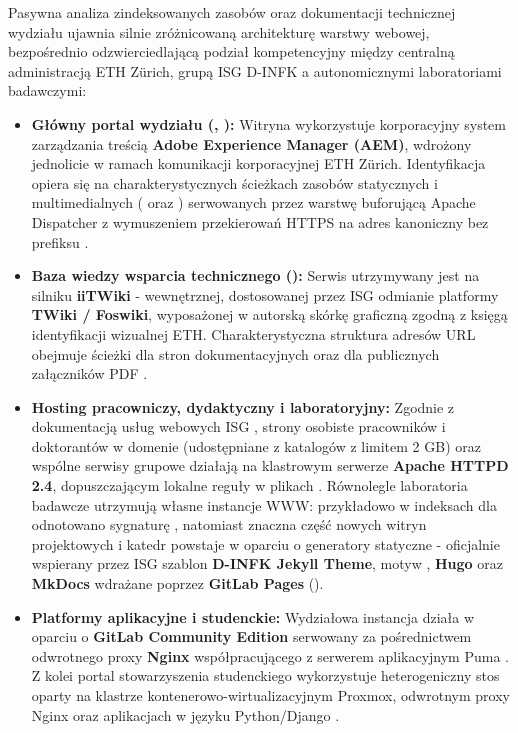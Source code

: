 {{Pasywna analiza zindeksowanych zasobów oraz dokumentacji technicznej wydziału ujawnia silnie zróżnicowaną architekturę warstwy webowej, bezpośrednio odzwierciedlającą podział kompetencyjny między centralną administracją ETH Zürich, grupą ISG D-INFK a autonomicznymi laboratoriami badawczymi:
\begin{itemize}
    \item \textbf{Główny portal wydziału (, ):} Witryna wykorzystuje korporacyjny system zarządzania treścią \textbf{Adobe Experience Manager (AEM)}, wdrożony jednolicie w ramach komunikacji korporacyjnej ETH Zürich. Identyfikacja opiera się na charakterystycznych ścieżkach zasobów statycznych i multimedialnych ( oraz ) serwowanych przez warstwę buforującą Apache Dispatcher z wymuszeniem przekierowań HTTPS na adres kanoniczny bez prefiksu .
    \item \textbf{Baza wiedzy wsparcia technicznego ():} Serwis utrzymywany jest na silniku \textbf{iiTWiki} - wewnętrznej, dostosowanej przez ISG odmianie platformy \textbf{TWiki / Foswiki}, wyposażonej w autorską skórkę graficzną zgodną z księgą identyfikacji wizualnej ETH. Charakterystyczna struktura adresów URL obejmuje ścieżki  dla stron dokumentacyjnych oraz  dla publicznych załączników PDF \cite{isg_dinfk_wiki}.
    \item \textbf{Hosting pracowniczy, dydaktyczny i laboratoryjny:} Zgodnie z dokumentacją usług webowych ISG \cite{isg_dinfk_wiki}, strony osobiste pracowników i doktorantów w domenie  (udostępniane z katalogów  z limitem 2 GB) oraz wspólne serwisy grupowe działają na klastrowym serwerze \textbf{Apache HTTPD 2.4}, dopuszczającym lokalne reguły w plikach . Równolegle laboratoria badawcze utrzymują własne instancje WWW: przykładowo w indeksach dla  odnotowano sygnaturę , natomiast znaczna część nowych witryn projektowych i katedr powstaje w oparciu o generatory statyczne - oficjalnie wspierany przez ISG szablon \textbf{D-INFK Jekyll Theme}, motyw , \textbf{Hugo} oraz \textbf{MkDocs} wdrażane poprzez \textbf{GitLab Pages} ().
    \item \textbf{Platformy aplikacyjne i studenckie:} Wydziałowa instancja  działa w oparciu o \textbf{GitLab Community Edition} serwowany za pośrednictwem odwrotnego proxy \textbf{Nginx} współpracującego z serwerem aplikacyjnym Puma \cite{gitlab_dinfk}. Z kolei portal stowarzyszenia studenckiego  wykorzystuje heterogeniczny stos oparty na klastrze kontenerowo-wirtualizacyjnym Proxmox, odwrotnym proxy Nginx oraz aplikacjach w języku Python/Django \cite{vis_ethz}.
\end{itemize}

}}
